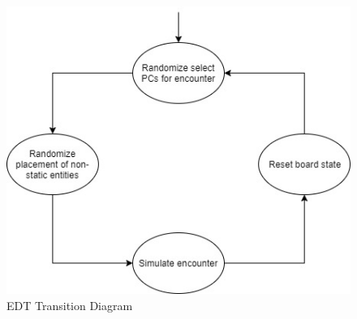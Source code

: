 \documentclass[letterpaper, 10 pt, conference]{ieeeconf}
\begin{document}
\begin{figure}[H]
	\centering
	\centerline{\includegraphics[scale=.37]{EDTTransitionDiagram}}
	\caption{EDT Transition Diagram}
	\label{fig: EDT Transition Diagram}
\end{figure}
\end{document}
